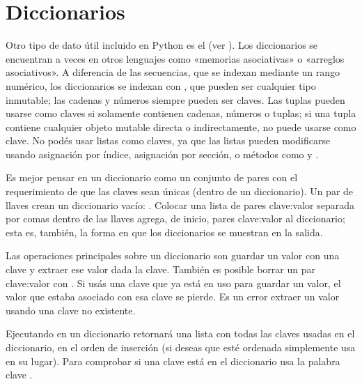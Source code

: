 \documentclass[a5paper,10pt,spanish]{sphinxmanual}
\begin{document}
\section{Diccionarios}
\label{\detokenize{tutorial/datastructures:dictionaries}}\label{\detokenize{tutorial/datastructures:tut-dictionaries}}
\sphinxAtStartPar
Otro tipo de dato útil incluido en Python es el  (ver ).  Los diccionarios se encuentran a veces en otros lenguajes como «memorias asociativas» o «arreglos asociativos».  A diferencia de las secuencias, que se indexan mediante un rango numérico, los diccionarios se indexan con , que pueden ser cualquier tipo inmutable; las cadenas y números siempre pueden ser claves.  Las tuplas pueden usarse como claves si solamente contienen cadenas, números o tuplas; si una tupla contiene cualquier objeto mutable directa o indirectamente, no puede usarse como clave. No podés usar listas como claves, ya que las listas pueden modificarse usando asignación por índice, asignación por sección, o métodos como  y .

\sphinxAtStartPar
Es mejor pensar en un diccionario como un conjunto de pares  con el requerimiento de que  las claves sean únicas (dentro de un diccionario). Un par de llaves crean un diccionario vacío: \sphinxcode{\sphinxupquote{\{\}}}.  Colocar una lista de pares clave:valor separada por comas dentro de las llaves agrega, de inicio, pares  clave:valor al diccionario; esta es, también, la forma en que los diccionarios se muestran en la salida.

\sphinxAtStartPar
Las operaciones principales sobre un diccionario son guardar un valor con una clave y extraer ese valor dada la clave.  También es posible borrar un par clave:valor con .  Si usás una clave que ya está en uso para guardar un valor, el valor que estaba asociado con esa clave se pierde.  Es un error extraer un valor usando una clave no existente.

\sphinxAtStartPar
Ejecutando  en un diccionario retornará una lista con todas las claves usadas en el diccionario, en el orden de inserción (si deseas que esté ordenada simplemente usa  en su lugar). Para comprobar si una clave está en el diccionario usa la palabra clave .
\end{document}

